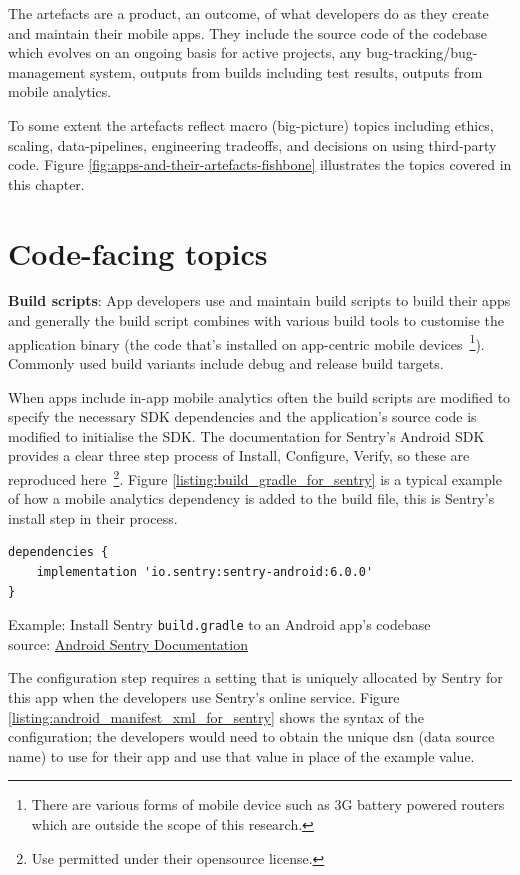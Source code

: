 The artefacts are a product, an outcome, of what developers do as they create and maintain their mobile apps. They include the source code of the codebase which evolves on an ongoing basis for active projects, any bug-tracking/bug-management system, outputs from builds including test results, outputs from mobile analytics. 

To some extent the artefacts reflect macro (big-picture) topics including ethics, scaling, data-pipelines, engineering tradeoffs, and decisions on using third-party code. Figure \ref{fig:apps-and-their-artefacts-fishbone} illustrates the topics covered in this chapter.


\section{Code-facing topics}
\textbf{Build scripts}: App developers use and maintain build scripts to build their apps and generally the build script combines with various build tools to customise the application binary (the code that's installed on app-centric mobile devices~\footnote{There are various forms of mobile device such as 3G battery powered routers which are outside the scope of this research.}). Commonly used build variants include debug and release build targets. 

When apps include in-app mobile analytics often the build scripts are modified to specify the necessary SDK dependencies and the application's source code is modified to initialise the SDK. The documentation for Sentry's Android SDK provides a clear three step process of Install, Configure, Verify, so these are reproduced here~\footnote{Use permitted under their opensource license.}. Figure \ref{listing:build_gradle_for_sentry} is a typical example of how a mobile analytics dependency is added to the build file, this is Sentry's install step in their process.

\begin{listing}
\begin{verbatim}
dependencies {
    implementation 'io.sentry:sentry-android:6.0.0'
}
\end{verbatim}
\caption{Example: Install Sentry \texttt{build.gradle} to an Android app's codebase\\source: \href{https://docs.sentry.io/platforms/android/}{Android Sentry Documentation}}
\label{listing:build_gradle_for_sentry}
\end{listing}

The configuration step requires a setting that is uniquely allocated by Sentry for this app when the developers use Sentry's online service. Figure \ref{listing:android_manifest_xml_for_sentry} shows the syntax of the configuration; the developers would need to obtain the unique dsn (data source name) to use for their app and use that value in place of the example value.

